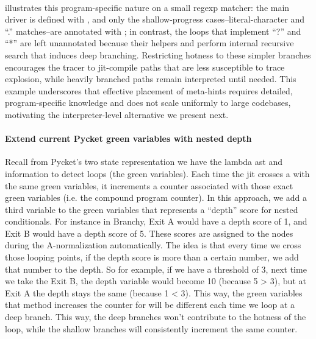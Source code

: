    \paragraph{}%
       illustrates this program-specific nature on a small regexp matcher: the main driver  is defined with , and only the shallow-progress cases--literal-character and “.” matches--are annotated with ; in contrast, the loops that implement “?” and “*” are left unannotated because their helpers  and  perform internal recursive search that induces deep branching. Restricting hotness to these simpler branches encourages the tracer to \gls{jit}-compile paths that are less susceptible to trace explosion, while heavily branched paths remain interpreted until needed. This example underscores that effective placement of meta-hints requires detailed, program-specific knowledge and does not scale uniformly to large codebases, motivating the interpreter-level alternative we present next.

    \paragraph{Extend current Pycket green variables with nested  depth}%
      Recall from Pycket's two state representation we have the lambda \gls{ast} and  information to detect loops (the green variables). Each time the \gls{jit} crosses a  with the same green variables, it increments a counter associated with those exact green variables (i.e. the compound program counter). In this approach, we add a third variable to the green variables that represents a “depth” score for nested conditionals. For instance in Branchy, Exit A would have a depth score of 1, and Exit B would have a depth score of 5. These scores are assigned to the  nodes during the A-normalization automatically. The idea is that every time we cross those looping points, if the depth score is more than a certain number, we add that number to the depth. So for example, if we have a threshold of 3, next time we take the Exit B, the depth variable would become 10 (because 5 > 3), but at Exit A the depth stays the same (because 1 < 3). This way, the green variables that  method increases the counter for will be different each time we loop at a deep branch. This way, the deep branches won't contribute to the hotness of the loop, while the shallow branches will consistently increment the same counter.

